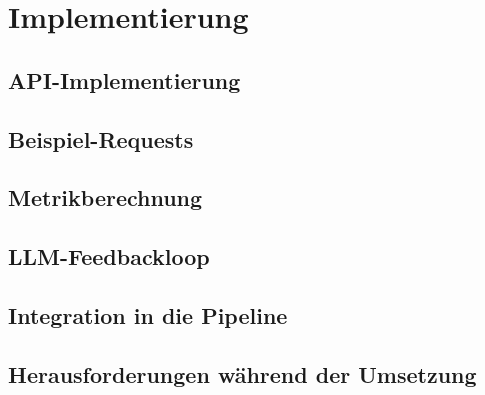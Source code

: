 \chapter{Implementierung}\label{ch:Implementierung}


\section{API-Implementierung}


\section{Beispiel-Requests}


\section{Metrikberechnung}


\section{LLM-Feedbackloop}


\section{Integration in die Pipeline}


\section{Herausforderungen während der Umsetzung}
